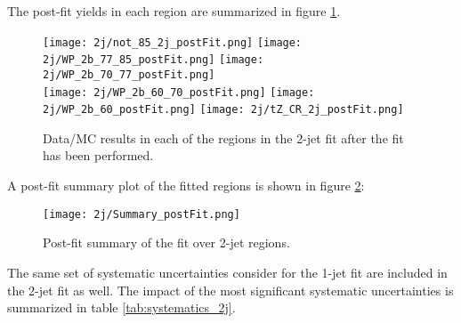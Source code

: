 The post-fit yields in each region are summarized in figure \ref{fig:fit_regions_2j}.

\begin{figure}[H]
    \center
    \texttt{[image: 2j/not\_85\_2j\_postFit.png]}%
    \texttt{[image: 2j/WP\_2b\_77\_85\_postFit.png]}%
    \texttt{[image: 2j/WP\_2b\_70\_77\_postFit.png]}\\
    \texttt{[image: 2j/WP\_2b\_60\_70\_postFit.png]}%
    \texttt{[image: 2j/WP\_2b\_60\_postFit.png]}%
    \texttt{[image: 2j/tZ\_CR\_2j\_postFit.png]}\\
    \caption{Data/MC results in each of the regions in the 2-jet fit after the fit has been performed.}
    \label{fig:fit_regions_2j}
\end{figure}

A post-fit summary plot of the fitted regions is shown in figure \ref{fig:fit_results_2j}: 

\begin{figure}[H]
    \center
    \texttt{[image: 2j/Summary\_postFit.png]}
    \caption{Post-fit summary of the fit over 2-jet regions.}
    \label{fig:fit_results_2j}
\end{figure}


The same set of systematic uncertainties consider for the 1-jet fit are included in the 2-jet fit as well. The impact of the most significant systematic uncertainties is summarized in table \ref{tab:systematics_2j}. 

